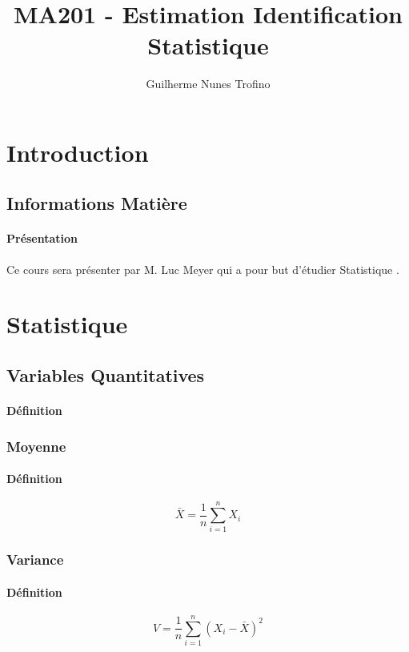 \documentclass{article}
\title{MA201 - Estimation Identification Statistique}
\author{Guilherme Nunes Trofino}
\begin{document}
\maketitle

\newpage\tableofcontents

\section{Introduction}

% 


\subsection{Informations Matière}
\paragraph{Présentation}Ce cours sera présenter par M. Luc Meyer qui a pour but d'étudier Statistique .


\section{Statistique}
\subsection{Variables Quantitatives}
\paragraph{Définition}

\subsubsection{Moyenne}
\paragraph{Définition}
\begin{equation}
    \boxed{
        \bar{X} = \frac{1}{n} \sum^{n}_{i=1} X_{i}
    }
\end{equation}

\subsubsection{Variance}
\paragraph{Définition}
\begin{equation}
    \boxed{
        V = \frac{1}{n} \sum^{n}_{i=1} (X_{i} - \bar{X})^{2}
    }
\end{equation}
\end{document}
